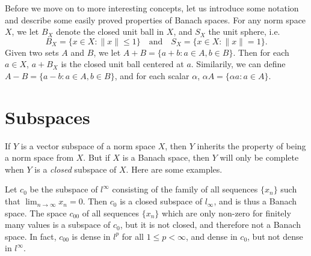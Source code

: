 Before we move on to more interesting concepts, let us introduce some notation and describe some easily proved properties of Banach spaces. For any norm space $X$, we let $B_X$ denote the closed unit ball in $X$, and $S_X$ the unit sphere, i.e.
%
\[ B_X = \{ x \in X: \| x \| \leq 1 \}\quad\text{and}\quad S_X = \{ x \in X: \| x \| = 1 \}. \]
%
Given two sets $A$ and $B$, we let $A + B = \{ a + b : a \in A, b \in B \}$. Then for each $a \in X$, $a + B_X$ is the closed unit ball centered at $a$. Similarily, we can define $A - B = \{ a - b : a \in A, b \in B \}$, and for each scalar $\alpha$, $\alpha A = \{ \alpha a : a \in A \}$.

\section{Subspaces}

If $Y$ is a vector subspace of a norm space $X$, then $Y$ inherits the property of being a norm space from $X$. But if $X$ is a Banach space, then $Y$ will only be complete when $Y$ is a \emph{closed} subspace of $X$. Here are some examples.

\begin{example}
    Let $c_0$ be the subspace of $l^\infty$ consisting of the family of all sequences $\{ x_n \}$ such that $\lim_{n \to \infty} x_n = 0$. Then $c_0$ is a closed subspace of $l_\infty$, and is thus a Banach space. The space $c_{00}$ of all sequences $\{ x_n \}$ which are only non-zero for finitely many values is a subspace of $c_0$, but it is not closed, and therefore not a Banach space. In fact, $c_{00}$ is dense in $l^p$ for all $1 \leq p < \infty$, and dense in $c_0$, but not dense in $l^\infty$.
\end{example}

